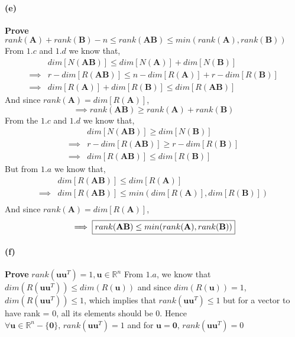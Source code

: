 \documentclass[12pt, letterpaper]{article}
\begin{document}
\paragraph{(e)} \textbf{Prove} $rank(\mathbf{A}) + rank(\mathbf{B}) - n \leq rank(\mathbf{AB}) \leq min(rank(\mathbf{A}), rank(\mathbf{B}))$
\newline\newline
From $1.c$ and $1.d$ we know that,
\[
  \begin{split}
    &dim[N(\mathbf{AB})] \leq dim[N(\mathbf{A})] + dim[N(\mathbf{B})]\\
    \implies &r - dim[R(\mathbf{AB})] \leq n - dim[R(\mathbf{A})] + r - dim[R(\mathbf{B})]\\
    \implies &dim[R(\mathbf{A})] + dim[R(\mathbf{B})] \leq dim[R(\mathbf{AB})]
  \end{split}
\]
And since $rank(\mathbf{A}) = dim[R(\mathbf{A})]$,
\begin{equation}
  \label{eq:1}
  \implies \boxed{rank(\mathbf{AB}) \geq rank(\mathbf{A}) + rank(\mathbf{B})}
\end{equation}
\newline\newline
From the $1.c$ and $1.d$ we know that,
\[
  \begin{split}
    &dim[N(\mathbf{AB})] \geq dim[N(\mathbf{B})]\\
    \implies &r - dim[R(\mathbf{AB})] \geq r - dim[R(\mathbf{B})]\\
    \implies &dim[R(\mathbf{AB})] \leq dim[R(\mathbf{B})]
  \end{split}
\]
But from $1.a$ we know that,
\[
  \begin{split}
    &dim[R(\mathbf{AB})] \leq dim[R(\mathbf{A})]\\
    \implies &dim[R(\mathbf{AB})] \leq min(dim[R(\mathbf{A})], dim[R(\mathbf{B})])\\
  \end{split}
\]
And since $rank(\mathbf{A}) = dim[R(\mathbf{A})]$,
\begin{equation}
  \label{eq:2}
    \implies \boxed{rank(\mathbf{AB}) \leq min(rank(\mathbf{A}), rank(\mathbf{B}))}\\
\end{equation}

\paragraph{(f)} \textbf{Prove} $rank(\mathbf{uu}^T) = 1, \mathbf{u} \in \mathbb{R}^n$
\newline\newline
From $1.a$, we know that $dim(R(\mathbf{uu}^T)) \leq dim(R(\mathbf{u}))$ and since $dim(R(\mathbf{u})) = 1$, $dim(R(\mathbf{uu}^T)) \leq 1$,
which implies that $rank(\mathbf{uu}^T) \leq 1$ but for a vector to have rank = 0, all its elements should
be 0.
\newline
Hence $\boxed{\forall \mathbf{u} \in \mathbb{R}^n - \{\mathbf{0}\},\, rank(\mathbf{uu}^T) = 1}$ and for $\mathbf{u} = \mathbf{0},\, rank(\mathbf{uu}^T) = 0$
\end{document}
